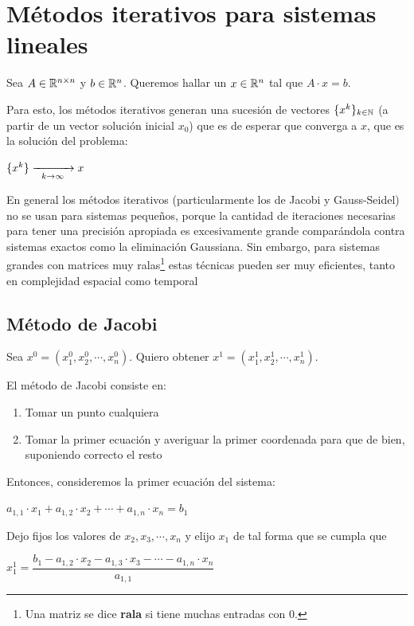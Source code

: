 \documentclass[]{article}
\begin{document}
\newpage

\section{Métodos iterativos para sistemas lineales}
Sea $A\in\mathbb{R}^{n \times n}$ y $b\in\mathbb{R}^n$. Queremos hallar un $x\in\mathbb{R}^n$ tal que $A\cdot x = b$.

Para esto, los métodos iterativos generan una sucesión de vectores $\{x^k\}_{k\in\mathbb{N}}$ (a partir de un vector solución inicial $x_0$) que es de esperar que converga a $x$, que es la solución del problema:
\begin{center}
	$\{x^k\} \xrightarrow[\hspace{0.2cm}k\to\infty\hspace{0.2cm}]{} x$
\end{center}

En general los métodos iterativos (particularmente los de Jacobi y Gauss-Seidel) no se usan para sistemas pequeños, porque la cantidad de iteraciones necesarias para tener una precisión apropiada es excesivamente grande comparándola contra sistemas exactos como la eliminación Gaussiana. Sin embargo, para sistemas grandes con matrices muy ralas\footnote{Una matriz se dice \textbf{rala} si tiene muchas entradas con 0.} estas técnicas pueden ser muy eficientes, tanto en complejidad espacial como temporal

\subsection{Método de Jacobi}
Sea $x^0 = (x^0_1,x^0_2,\cdots,x^0_n)$. Quiero obtener $x^1 = (x^1_1,x^1_2,\cdots,x^1_n)$.

El método de Jacobi consiste en:
\begin{enumerate}
	\item Tomar un punto cualquiera
	\item Tomar la primer ecuación y averiguar la primer coordenada para que de bien, suponiendo correcto el resto
\end{enumerate}

Entonces, consideremos la primer ecuación del sistema:
\begin{center}
	$a_{1,1}\cdot x_1 + a_{1,2}\cdot x_2 + \cdots + a_{1,n}\cdot x_n = b_1$
\end{center}

Dejo fijos los valores de $x_2,x_3,\cdots,x_n$ y elijo $x_1$ de tal forma que se cumpla que
\begin{center}
	$x_1^1=\dfrac{b_1 - a_{1,2}\cdot x_2 - a_{1,3}\cdot x_3 - \cdots - a_{1,n}\cdot x_n}{a_{1,1}}$
\end{center}
\end{document}
